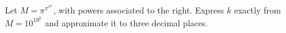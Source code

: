 Let $M=\pi^{\pi^{\pi^\pi}}$, with powers associated to the right. Express $k$ exactly from $M=10^{10^k}$ and approximate it to three decimal places.

